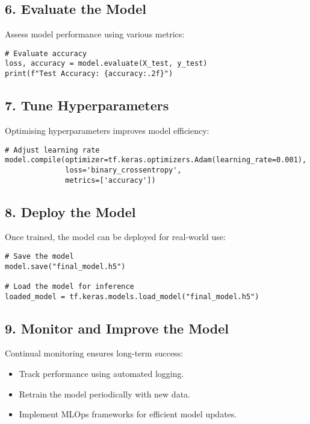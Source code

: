 \subsection{6. Evaluate the Model}

Assess model performance using various metrics:
\begin{verbatim}
# Evaluate accuracy
loss, accuracy = model.evaluate(X_test, y_test)
print(f"Test Accuracy: {accuracy:.2f}")
\end{verbatim}

\subsection{7. Tune Hyperparameters}

Optimising hyperparameters improves model efficiency:
\begin{verbatim}
# Adjust learning rate
model.compile(optimizer=tf.keras.optimizers.Adam(learning_rate=0.001),
              loss='binary_crossentropy',
              metrics=['accuracy'])
\end{verbatim}

\subsection{8. Deploy the Model}

Once trained, the model can be deployed for real-world use:
\begin{verbatim}
# Save the model
model.save("final_model.h5")

# Load the model for inference
loaded_model = tf.keras.models.load_model("final_model.h5")
\end{verbatim}

\subsection{9. Monitor and Improve the Model}

Continual monitoring ensures long-term success:
\begin{itemize}
    \item Track performance using automated logging.
    \item Retrain the model periodically with new data.
    \item Implement MLOps frameworks for efficient model updates.
\end{itemize}

